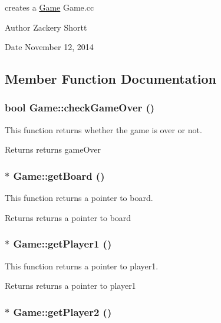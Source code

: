 creates a \hyperlink{classGame}{Game} Game.cc

\begin{DoxyAuthor}{Author}
Zackery Shortt 
\end{DoxyAuthor}
\begin{DoxyDate}{Date}
November 12, 2014 
\end{DoxyDate}


\subsection{Member Function Documentation}
\hypertarget{classGame_ae8cc2b6b0b07924769189f2fa7e07e2d}{
\subsubsection[{checkGameOver}]{\setlength{\rightskip}{0pt plus 5cm}bool Game::checkGameOver ()}}
\label{classGame_ae8cc2b6b0b07924769189f2fa7e07e2d}


This function returns whether the game is over or not. \begin{DoxyReturn}{Returns}
returns gameOver 
\end{DoxyReturn}
\hypertarget{classGame_aac82d38c4540fcfaef89059865d1ce31}{
\subsubsection[{getBoard}]{ $\ast$ Game::getBoard ()}}
\label{classGame_aac82d38c4540fcfaef89059865d1ce31}


This function returns a pointer to board. \begin{DoxyReturn}{Returns}
returns a pointer to board 
\end{DoxyReturn}
\hypertarget{classGame_a01d7146d789990ee8195bdcca57c327e}{
\subsubsection[{getPlayer1}]{ $\ast$ Game::getPlayer1 ()}}
\label{classGame_a01d7146d789990ee8195bdcca57c327e}


This function returns a pointer to player1. \begin{DoxyReturn}{Returns}
returns a pointer to player1 
\end{DoxyReturn}
\hypertarget{classGame_af0be7c35ebd72bbbf428331bd81aeacd}{
\subsubsection[{getPlayer2}]{ $\ast$ Game::getPlayer2 ()}}
\label{classGame_af0be7c35ebd72bbbf428331bd81aeacd}


